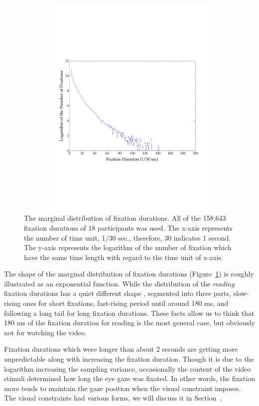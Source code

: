 \documentclass[oneside,master]{snueethesis}
\begin{document}
\begin{figure}
  \centerline{\includegraphics[width=150mm,height=110mm,trim=0mm 60mm 0mm 60mm]{./eps/marginal_fixation_duration.pdf}}
  \caption[The marginal distribution of fixation durations]{The marginal distribution of fixation durations. All of the 158,643 fixation durations of 18 participants was used. The x-axis represents the number of time unit, 1/30 sec., therefore, 30 indicates 1 second. The y-axis represents the logarithm of the number of fixation which have the same time length with regard to the time unit of x-axis.}
  \label{fig:marginal-fixation-duration}
\end{figure}

The shape of the marginal distribution of fixation durations (Figure~\ref{fig:marginal-fixation-duration}) is roughly illustrated as an exponential function. While the distribution of the \textit{reading} fixation durations has a quiet different shape \cite{Feng2006}, segmented into three parts, slow-rising ones for short fixations, fast-rising period until around 180 ms, and following a long tail for long fixation durations. These facts allow us to think that 180 ms of the fixation duration for reading is the most general case, but obviously not for watching the video.

Fixation durations which were longer than about 2 seconds are getting more unpredictable along with increasing the fixation duration. Though it is due to the logarithm increasing the sampling variance, occasionally the content of the video stimuli determined how long the eye gaze was fixated. In other words, the fixation more tends to maintain the gaze position when the visual constraint imposes. The visual constraints had various forms, we will discuss it in Section~.
\end{document}
